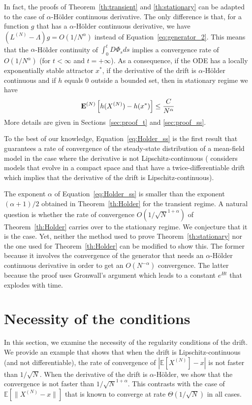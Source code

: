 \documentclass[acmlarge]{acmart}
\newcommand\XN{X^{(N)}}
\newcommand\LN{L^{(N)}}
\newcommand\sesp[1]{\mathbb{E}[#1]}
\newcommand\espN[1]{{\mathchoice{\bespN{#1}}{\sespN{#1}}{\sespN{#1}}{\sespN{#1}}}}
\newcommand\bespN[1]{\mathbf{E}^{(N)}\left[#1\right]}
\newcommand\sespN[1]{\mathbf{E}^{(N)}[#1]}
\newcommand\snorm[1]{\|#1\|}
\begin{document}
In fact, the proofs of Theorem~\ref{th:transient} and
\ref{th:stationary} can be adapted to the case of $\alpha$-Hölder
continuous derivative. The only difference is that, for a function $g$
that has a $\alpha$-Hölder continuous derivative, we have
$(\LN-\Lambda)g=O(1/N^\alpha)$ instead of
Equation~\eqref{eq:generator_2}. This means that the $\alpha$-Hölder
continuity of $\int_0^tD\Phi_sds$ implies a convergence rate of
$O(1/N^\alpha)$ (for $t<\infty$ and $t=+\infty$). As a consequence, if
the ODE has a locally exponentially stable attractor $x^*$, if the
derivative of the drift is $\alpha$-Hölder continuous and if $h$
equals $0$ outside a bounded set, then in stationary regime we have
\begin{align}
  \label{eq:Holder_ss}
  \espN{h(\XN)-h(x^*)} \le \frac{C}{N^\alpha}
\end{align}
More details are given in Sections~\ref{sec:proof_t} and
\ref{sec:proof_ss}.

To the best of our knowledge, Equation~\eqref{eq:Holder_ss} is the
first result that guarantees a rate of convergence of the steady-state
distribution of a mean-field model in the case where the derivative is
not Lipschitz-continuous (\cite{ying2016rate} considers models that
evolve in a compact space and that have a twice-differentiable drift
which implies that the derivative of the drift is
Lipschitz-continuous).

The exponent $\alpha$ of Equation~\eqref{eq:Holder_ss} is smaller than
the exponent $(\alpha+1)/2$ obtained in Theorem~\ref{th:Holder} for
the transient regime.  A natural question is whether the rate of
convergence $O(1/\sqrt{N}^{1+\alpha})$ of Theorem~\ref{th:Holder}
carries over to the stationary regime. We conjecture that it is the
case.  Yet, neither the method used to prove
Theorem~\ref{th:stationary} nor the one used for
Theorem~\ref{th:Holder} can be modified to show this. The former
because it involves the convergence of the generator that needs an
$\alpha$-Hölder continuous derivative in order to get an
$O(N^{-\alpha})$ convergence. The latter because the proof uses
Gronwall's argument which leads to a constant $e^{Ht}$ that explodes
with time.




\section{Necessity of the conditions}
\label{sec:numerical}

In this section, we examine the necessity of the regularity conditions
of the drift. We provide an example that shows that when the drift is
Lipschitz-continuous (and not differentiable), the rate of convergence
of $|\sesp{\XN}-x|$ is not faster than $1/\sqrt{N}$. When the
derivative of the drift is $\alpha$-Hölder, we show that the
convergence is not faster than $1/\sqrt{N}^{1+\alpha}$.  This
contrasts with the case of $\sesp{\snorm{\XN-x}}$ that is known to
converge at rate $\Theta(1/\sqrt{N})$ in all cases.
\end{document}
